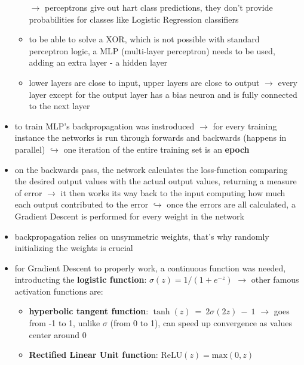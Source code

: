 \documentclass[12pt,a4paper]{article}
\begin{document}
\begin{itemize}
\begin{itemize}
    \newline \indent $\longrightarrow$ perceptrons give out hart class predictions, they don't provide probabilities for classes like Logistic Regression classifiers
    \item to be able to solve a XOR, which is not possible with standard perceptron logic, a MLP (multi-layer perceptron) needs to be used, adding an extra layer - a hidden layer
    \item lower layers are close to input, upper layers are close to output
    \newline \indent $\longrightarrow$ every layer except for the output layer has a bias neuron and is fully connected to the next layer
  \end{itemize}
  \item to train MLP's backpropagation was instroduced
  \newline \indent $\longrightarrow$ for every training instance the networks is run through forwards and backwards (happens in parallel)
  \newline \indent $\hookrightarrow$ one iteration of the entire training set is an \textbf{epoch}
  \item on the backwards pass, the network calculates the loss-function comparing the desired output values with the actual output values, returning a measure of error
  \newline \indent $\longrightarrow$ it then works its way back to the input computing how much each output contributed to the error
  \newline \indent $\hookrightarrow$ once the errors are all calculated, a Gradient Descent is performed for every weight in the network
  \item backpropagation relies on unsymmetric weights, that's why randomly initializing the weights is crucial
  \item for Gradient Descent to properly work, a continuous function was needed, introducting the \textbf{logistic function}: $\sigma(z) = 1/(1 + e^{-z})$
  \newline \indent $\longrightarrow$ other famous activation functions are: 
  \begin{itemize}
    \item \textbf{hyperbolic tangent function}: $\tanh(z)~=~2\sigma(2z)~-~1$
    \newline \indent $\longrightarrow$ goes from -1 to 1, unlike $\sigma$ (from 0 to 1), can speed up convergence as values center around 0
    \item \textbf{Rectified Linear Unit functio}n: $\mathrm{ReLU}(z) = \mathrm{max}(0, z)$

\end{itemize}
\end{itemize}
\end{document}
